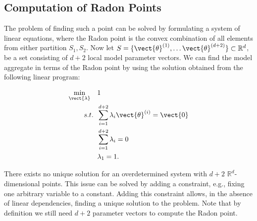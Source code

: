 \subsection{Computation of Radon Points}

The problem of finding such a point can be solved by formulating a system of linear equations, where the Radon point is the convex combination of all elements from either partition $S_1, S_2$.
Now let $S = \{\vect{\theta}^{(1)}, \ldots \vect{\theta}^{(d+2)}\} \subset \mathbb{R}^d$, be a set consisting of $d+2$ local model parameter vectors.
We can find the model aggregate in terms of the Radon point by using the solution obtained from the following linear program:

\begin{equation}
    \label{eq:radonopt}
    \begin{split}
        \min_{\vect{\lambda}} \quad &1 \\
        s.t. \;\; &\sum_{i=1}^{d+2} \lambda_i \vect{\theta}^{(i)} = \vect{0}\\
             \;\; &\sum_{i=1}^{d+2} \lambda_i = 0 \\
             \; \; & \lambda_1 = 1.
    \end{split}
\end{equation}

There exists no unique solution for an overdetermined system with $d+2$ $\mathbb{R}^d$-dimensional points.
This issue can be solved by adding a constraint, e.g., fixing one arbitrary variable to a constant. 
Adding this constraint allows, in the absence of linear dependencies, finding a unique solution to the problem.
Note that by definition we still need $d+2$ parameter vectors to compute the Radon point.

